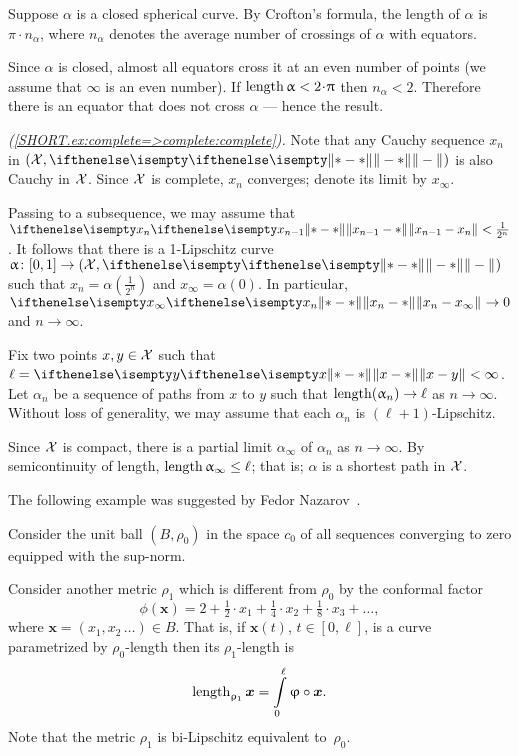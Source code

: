 Suppose $\alpha$ is a closed spherical curve. 
By Crofton's formula, the length of  $\alpha$  is $\pi\cdot n_\alpha$, where $n_\alpha$ denotes the average number of crossings of $\alpha$ with equators.

Since $\alpha$ is closed, almost all equators cross it at an even number of points (we assume that $\infty$ is an even number).
If $\length \alpha<2\cdot\pi$ then $n_\alpha<2$.
Therefore there is an equator that does not cross $\alpha$ --- hence the result.


\parbf{\ref{ex:complete=>complete};}
\textit{(\ref{SHORT.ex:complete=>complete:complete}).}
Note that any Cauchy sequence $x_n$ in $(\spc{X},\yetdist{}{}{})$ is also Cauchy in $\mathcal{X}$.
Since $\mathcal{X}$ is complete, $x_n$ converges; denote its limit by $x_\infty$.

Passing to a subsequence, we may assume that $\yetdist{x_{n-1}}{x_n}{}<\tfrac1{2^n}$.
It follows that there is a 1-Lipschitz curve $\alpha\:[0,1]\to (\spc{X},\yetdist{}{}{})$ such that $x_n=\alpha(\tfrac1{2^n})$ and $x_\infty=\alpha(0)$.
In particular, $\yetdist{x_n}{x_\infty}{}\to0$ and $n\to\infty$.

Fix two points $x,y\in\spc{X}$ such that $\ell=\yetdist{x}{y}{}<\infty$.
Let $\alpha_n$ be a sequence of paths from $x$ to $y$ such that $\length(\alpha_n)\to\ell$ as $n\to \infty$.
Without loss of generality, we may assume that each $\alpha_n$ is $(\ell+1)$-Lipschitz.

Since $\mathcal{X}$ is compact, there is a partial limit $\alpha_\infty$ of $\alpha_n$ as $n\to \infty$. By semicontinuity of length, $\length\alpha_\infty\le\ell$;
that is; $\alpha$ is a shortest path in $\mathcal{X}$.

The following example was suggested by Fedor Nazarov~\cite{nazarov}.

\medskip

Consider the unit ball $(B,\rho_0)$
in the space $c_0$ of all sequences converging to zero equipped with the sup-norm.

Consider another metric $\rho_1$ which is different from $\rho_0$ by the conformal factor
\[\phi(\bm{x})=2+\tfrac{1}2\cdot x_1+\tfrac{1}4\cdot x_2+\tfrac{1}8\cdot x_3+\dots,\]
where $\bm{x}=(x_1,x_2\,\dots)\in B$.
That is, if $\bm{x}(t)$, $t\in[0,\ell]$, is a curve parametrized by $\rho_0$-length 
then its $\rho_1$-length is 
\[\length_{\rho_1}\bm{x}=\int\limits_0^\ell\phi\circ\bm{x}.\]
Note that the metric $\rho_1$ is bi-Lipschitz equivalent  to~$\rho_0$.

